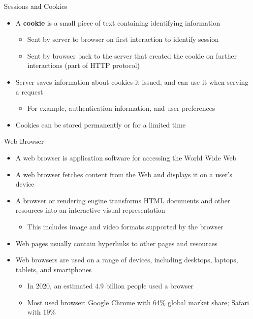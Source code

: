 \documentclass[aspectratio=169, xcolor=dvipsnames]{beamer}
\begin{document}
\begin{frame}{Sessions and Cookies}
    \begin{itemize}[<+->]
        \item A \textbf{cookie} is a small piece of text containing identifying information
        \begin{itemize}
            \item[$\triangleright$] Sent by server to browser on first interaction to identify session
            \item[$\triangleright$] Sent by browser back to the server that created the cookie on further interactions (part of HTTP protocol)
        \end{itemize}
        \item Server saves information about cookies it issued, and can use it when serving a request
        \begin{itemize}
            \item[$\triangleright$] For example, authentication information, and user preferences
        \end{itemize}
        \item Cookies can be stored permanently or for a limited time
    \end{itemize}
\end{frame}

\begin{frame}{Web Browser}
    \begin{itemize}[<+->]
        \item A web browser is application software for accessing the World Wide Web
        \item A web browser fetches content from the Web and displays it on a user's device
        \item A browser or rendering engine transforms HTML documents and other resources into an interactive visual representation
        \begin{itemize}
            \item[$\triangleright$] This includes image and video formats supported by the browser
        \end{itemize}
        \item Web pages usually contain hyperlinks to other pages and resources
        \item Web browsers are used on a range of devices, including desktops, laptops, tablets, and smartphones
        \begin{itemize}
            \item[$\triangleright$] In 2020, an estimated 4.9 billion people used a browser
            \item[$\triangleright$] Most used browser: Google Chrome with 64\% global market share; Safari with 19\%
        \end{itemize}
    \end{itemize}
\end{frame}
\end{document}
